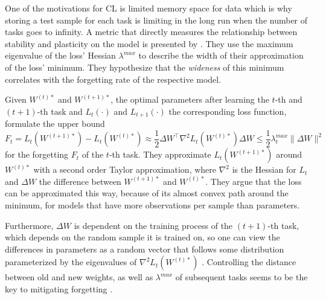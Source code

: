 One of the motivations for CL is limited memory space for data which is why storing a test sample for each task is limiting in the long run when the number of tasks goes to infinity. A metric that directly measures the relationship between stability and plasticity on the model is presented by \citeauthor{mirzadeh2020understandingroletrainingregimes}\cite{mirzadeh2020understandingroletrainingregimes}. They use the maximum eigenvalue of the loss' Hessian $\lambda^{max}$ to describe the width of their approximation of the loss' minimum. They hypothesize that the \textit{wideness} of this minimum correlates with the forgetting rate of the respective model.

Given $W^{(t)*}$ and $W^{(t+1)*}$, the optimal parameters after learning the $t$-th and $(t+1)$-th task and $L_t(\cdot)$ and $L_{t+1}(\cdot)$ the corresponding loss function, \citeauthor{mirzadeh2020understandingroletrainingregimes} formulate the upper bound
\begin{equation}\label{2TA}
	F_t = L_t(W^{(t+1)*}) - L_t(W^{(t)*}) \approx \frac{1}{2}{\Delta W}^\top \nabla^2 L_t(W^{(t)*}) \Delta W \leq \frac{1}{2}\lambda_t^{max}\lVert \Delta W \rVert^2
\end{equation}
for the forgetting $F_t$ of the $t$-th task. They approximate $L_t(W^{(t+1)*})$ around $W^{(t)*}$ with a second order Taylor approximation, where $\nabla^2$ is the Hessian for $L_t$ and $\Delta W$ the difference between $W^{(t+1)*}$ and $W^{(t)*}$. They argue that the loss can be approximated this way, because of its almost convex path around the minimum, for models that have more observations per sample than parameters.

Furthermore, ${\Delta W}$ is dependent on the training process of the $(t+1)$-th task, which depends on the random sample it is trained on, so one can view the differences in parameters as a random vector that follows some distribution parameterized by the eigenvalues of $\nabla^2 L_t(W^{(t)*})$ \cite{mirzadeh2020understandingroletrainingregimes}. Controlling the distance between old and new weights, as well as $\lambda^{max}$ of subsequent tasks seems to be the key to mitigating forgetting \cite{mirzadeh2020understandingroletrainingregimes}.

